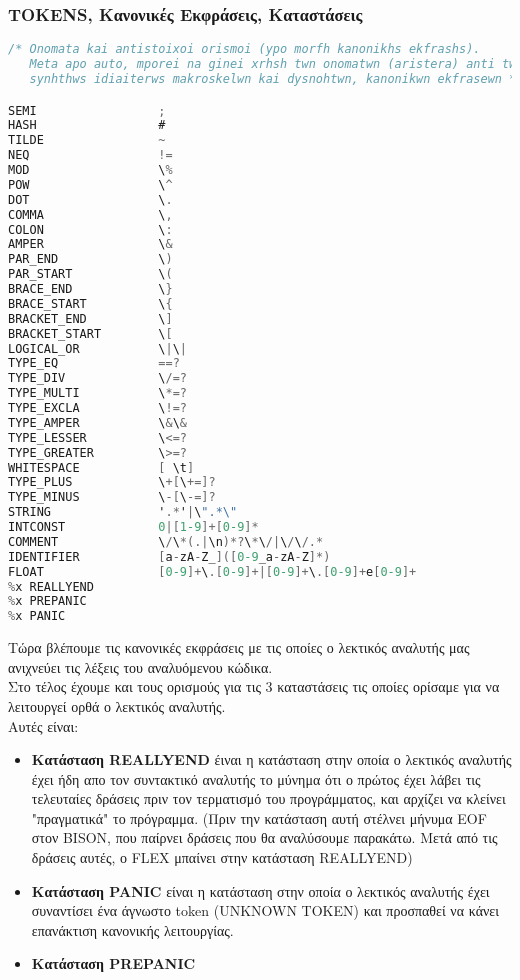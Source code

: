 \documentclass[14pt]{extarticle}
\begin{document}
\subsubsection{TOKENS, Kανονικές Eκφράσεις, Καταστάσεις}
\begin{lstlisting}[language=C]
/* Onomata kai antistoixoi orismoi (ypo morfh kanonikhs ekfrashs).
   Meta apo auto, mporei na ginei xrhsh twn onomatwn (aristera) anti twn,
   synhthws idiaiterws makroskelwn kai dysnohtwn, kanonikwn ekfrasewn */

SEMI                 ;
HASH                 #
TILDE                ~
NEQ                  !=
MOD                  \%
POW                  \^
DOT                  \.
COMMA                \,
COLON                \:
AMPER                \&
PAR_END              \)
PAR_START            \(
BRACE_END            \}
BRACE_START          \{
BRACKET_END          \]
BRACKET_START        \[
LOGICAL_OR           \|\|
TYPE_EQ              ==?
TYPE_DIV             \/=?
TYPE_MULTI           \*=?
TYPE_EXCLA           \!=?
TYPE_AMPER           \&\&
TYPE_LESSER          \<=?
TYPE_GREATER         \>=?
WHITESPACE           [ \t]
TYPE_PLUS            \+[\+=]?
TYPE_MINUS           \-[\-=]?
STRING               '.*'|\".*\"
INTCONST             0|[1-9]+[0-9]*
COMMENT              \/\*(.|\n)*?\*\/|\/\/.*
IDENTIFIER           [a-zA-Z_]([0-9_a-zA-Z]*)
FLOAT                [0-9]+\.[0-9]+|[0-9]+\.[0-9]+e[0-9]+
%x REALLYEND
%x PREPANIC
%x PANIC
\end{lstlisting}
Τώρα βλέπουμε τις κανονικές εκφράσεις με τις οποίες ο λεκτικός αναλυτής μας
ανιχνεύει τις λέξεις του αναλυόμενου κώδικα.
\\
Στο τέλος έχουμε και τους ορισμούς για τις 3 καταστάσεις τις οποίες ορίσαμε για να λειτουργεί ορθά
ο λεκτικός αναλυτής.
\\
Αυτές είναι:
\begin{itemize}
    \item \textbf{Κατάσταση REALLYEND} έιναι η κατάσταση στην οποία ο λεκτικός
        αναλυτής έχει ήδη απο τον συντακτικό αναλυτής το μύνημα ότι ο πρώτος έχει
        λάβει τις τελευταίες δράσεις πριν τον τερματισμό του προγράμματος, και
        αρχίζει να κλείνει "πραγματικά" το πρόγραμμα. (Πριν την κατάσταση αυτή
        στέλνει μήνυμα EOF στον BISON, που παίρνει δράσεις που θα αναλύσουμε
        παρακάτω. Μετά από τις δράσεις αυτές, ο FLEX μπαίνει στην κατάσταση REALLYEND)
    \item \textbf{Κατάσταση PANIC} είναι η κατάσταση στην οποία ο λεκτικός αναλυτής
        έχει συναντίσει ένα άγνωστο token (UNKNOWN TOKEN) και προσπαθεί να κάνει
        επανάκτιση κανονικής λειτουργίας.
    \item \textbf{Κατάσταση PREPANIC}
\end{itemize}
\end{document}

